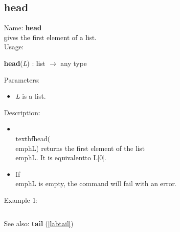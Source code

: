 \subsection{head}
\label{labhead}
\noindent Name: \textbf{head}\\
gives the first element of a list.\\
\noindent Usage: 
\begin{center}
\textbf{head}(\emph{L}) : \textsf{list} $\rightarrow$ \textsf{any type}\\
\end{center}
Parameters: 
\begin{itemize}
\item \emph{L} is a list.
\end{itemize}
\noindent Description: \begin{itemize}

\item \\textbf{head}(\\emph{L}) returns the first element of the list \\emph{L}. It is equivalent\n   to L[0].\n
\item If \\emph{L} is empty, the command will fail with an error.\n\end{itemize}
\noindent Example 1: 
\begin{center}\begin{minipage}{15cm}\begin{Verbatim}[frame=single]
\end{Verbatim}
\end{minipage}\end{center}
See also: \textbf{tail} (\ref{labtail})

